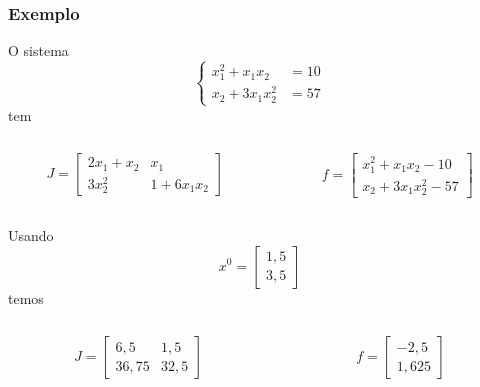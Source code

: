 \begin{frame}
    \frametitle{Exemplo}
    O sistema
    \[
        \begin{cases}
            x_1^2 + x_1x_2 &= 10 \\
            x_2 + 3x_1x_2^2 &= 57
        \end{cases}
    \]
    tem

    \begin{columns}[T]
        \begin{column}{0.45\textwidth}
            \[
                J=
                \begin{bmatrix}
                    2x_1 + x_2 & x_1 \\
                    3x_2^2 & 1 + 6x_1x_2
                \end{bmatrix}
            \]
        \end{column}

        \begin{column}{0.45\textwidth}

            \[
                f=
                \begin{bmatrix}
                    x_1^2 + x_1x_2 - 10 \\
                    x_2 + 3x_1x_2^2 - 57
                \end{bmatrix}
            \]
        \end{column}
    \end{columns}

    Usando
    \[
        x^0=
        \begin{bmatrix}
            1,5 \\ 3,5
        \end{bmatrix}
    \]
    temos

    \begin{columns}
        \begin{column}{0.45\textwidth}
            \[
                J=
                \begin{bmatrix}
                    6,5 & 1,5 \\
                    36,75 & 32,5
                \end{bmatrix}
            \]
        \end{column}

        \begin{column}{0.45\textwidth}
            \[
                f=
                \begin{bmatrix}
                    -2,5 \\
                    1,625
                \end{bmatrix}
            \]
        \end{column}
    \end{columns}
\end{frame}

